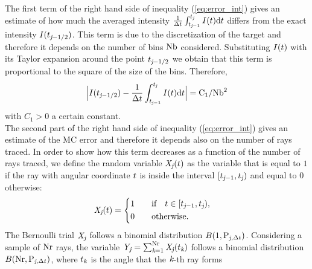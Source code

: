 \indent The first term of the right hand side of inequality (\ref{eq:error_int}) gives an estimate of how much the averaged intensity
 $\frac{1}{\Delta t}\int_{t_{\textit{j}-1}}^{t_{\textit{j}}} I(t)\textrm{d}t$ differs from the exact intensity $I(t_{\textit{j}-1/2})$.
This term is due to the discretization of the target and therefore it depends on the number of bins $\textrm{Nb}$ considered.
  Substituting $I(t)$ with its Taylor expansion around the point $t_{\textit{j}-1/2}$ we obtain that this term is proportional to the square of the size of the bins. 
Therefore,
\begin{equation}\Big|I(t_{\textit{j}-1/2})-\frac{1}{\Delta t}\int_{t_{\textit{j}-1}}^{t_{\textit{j}}} I(t)\textrm{d}t\Big| = \textrm{C}_1/\textrm{Nb}^2\end{equation}
with $C_1>0$ a certain constant. \\
\indent
The second part of the right hand side of inequality (\ref{eq:error_int}) gives an estimate of the MC error and therefore it depends also on the
number of rays traced.
In order to show how this term decreases as a function of the number of rays traced,
we define the random variable $\textit{X}_{\textit{j}}(t)$ as the variable that is equal to $1$ if the ray with angular coordinate $t$
is inside the interval $[t_{\textit{j}-1}, t_{\textit{j}})$ and equal to $0$ otherwise:
\begin{equation}
\label{radom_variable}
\textit{X}_{\textit{j}}(t) = \begin{cases} \begin{aligned}
1& \qquad \mbox{if} \quad t\in [t_{\textit{j}-1}, t_{\textit{j}}),\\
0 & \qquad \mbox{otherwise}.
\end{aligned}\end{cases}
\end{equation}
The Bernoulli trial $ \textit{X}_{\textit{j}}$ follows a binomial distribution $B(1,\textrm{P}_{\textit{j}, \Delta t})$.
Considering a sample of $\textrm{Nr}$ rays, the variable $\textit{Y}_{\textit{j}} = \sum_{\textit{k}=1}^{\textrm{Nr}} \textit{X}_{\textit{j}}(t_{\textit{k}})$
follows a binomial distribution $B(\textrm{Nr}, \textrm{P}_{\textit{j},\Delta t})$, where $t_{\textit{k}}$ is the angle that the $\textit{k}$-th ray forms
